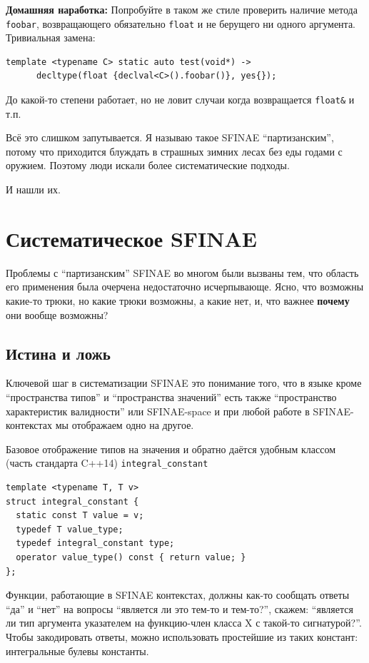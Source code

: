 \documentclass[a4paper,12pt,oneside]{book}
\begin{document}
\textbf{Домашняя наработка:} Попробуйте в таком же стиле проверить наличие метода \lstinline!foobar!, возвращающего обязательно \lstinline!float! и не берущего ни одного аргумента. Тривиальная замена:

\begin{lstlisting}
template <typename C> static auto test(void*) ->
      decltype(float {declval<C>().foobar()}, yes{});
\end{lstlisting}

До какой-то степени работает, но не ловит случаи когда возвращается \lstinline!float&! и т.п.

Всё это слишком запутывается. Я называю такое SFINAE ``партизанским'', потому что приходится блуждать в страшных зимних лесах без еды годами с оружием. Поэтому люди искали более систематические подходы.

И нашли их.

\pagebreak
\section{Систематическое SFINAE}

Проблемы с ``партизанским'' SFINAE во многом были вызваны тем, что область его применения была очерчена недостаточно исчерпывающе. Ясно, что возможны какие-то трюки, но какие трюки возможны, а какие нет, и, что важнее \textbf{почему} они вообще возможны?

\subsection{Истина и ложь}

Ключевой шаг в систематизации SFINAE это понимание того, что в языке кроме ``пространства типов'' и ``пространства значений'' есть также ``пространство характеристик валидности'' или SFINAE-space и при любой работе в SFINAE-контекстах мы отображаем одно на другое.

Базовое отображение типов на значения и обратно даётся удобным классом (часть стандарта C++14) \lstinline!integral_constant!

\begin{lstlisting}
template <typename T, T v> 
struct integral_constant {
  static const T value = v;
  typedef T value_type;
  typedef integral_constant type;
  operator value_type() const { return value; } 
};
\end{lstlisting}

Функции, работающие в SFINAE контекстах, должны как-то сообщать ответы ``да'' и ``нет'' на вопросы ``является ли это тем-то и тем-то?'', скажем: ``является ли тип аргумента указателем на функцию-член класса X с такой-то сигнатурой?''. Чтобы закодировать ответы, можно использовать простейшие из таких констант: интегральные булевы константы.
\end{document}
